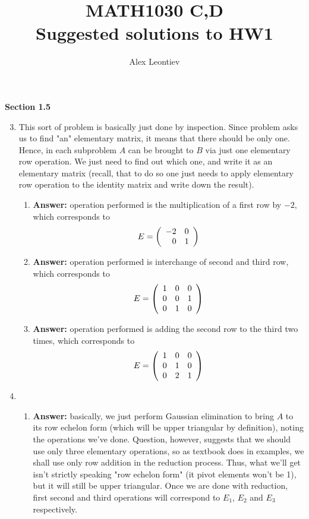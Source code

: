 \documentclass[8pt]{article} %
\title{MATH1030 C,D\\Suggested solutions to HW1}
\author{Alex Leontiev}
\begin{document}
\maketitle
	\renewcommand{\v}{\mathbf{v}}
	\renewcommand{\u}{\mathbf{u}}
	\renewcommand{\i}{\mathbf{i}}
	\renewcommand{\j}{\mathbf{j}}
	\renewcommand{\k}{\mathbf{k}}
	\newcommand{\w}{\mathbf{w}}
\textbf{Section 1.5}
\begin{enumerate}[label=\arabic*]
	\setcounter{enumi}{2}
	\item This sort of problem is basically just done by inspection. Since problem asks us to find "an" elementary matrix,
		it means that there should be only one. Hence, in each subproblem $A$ can be brought to $B$ via just one elementary
		row operation. We just need to find out which one, and write it as an elementary matrix (recall, that to do so
		one just needs to apply elementary row operation to the identity matrix and write down the result).
		\begin{enumerate}[label=(\alph*)]
			\item {\bf Answer: }operation performed is the multiplication of a first row by $-2$, which corresponds to
				\[E=\left(\begin{array}{rr}-2&0\\0&1\end{array}\right)\]
			\item {\bf Answer: }operation performed is interchange of second and third row, which corresponds to
				\[E=\left(\begin{array}{lll}1&0&0\\0&0&1\\0&1&0\end{array}\right)\]
			\item {\bf Answer: }operation performed is adding the second row to the third two times, which corresponds to
				\[E=\left(\begin{array}{lll}1&0&0\\0&1&0\\0&2&1\end{array}\right)\]
		\end{enumerate}
	\setcounter{enumi}{5}
	\item
		\begin{enumerate}[label=(\alph*)]
			\item {\bf Answer: }basically, we just perform Gaussian elimination to bring $A$ to its row echelon form
				(which will be upper triangular by definition), noting the operations we've done. Question, however,
				suggests that we should use only three elementary operations, so as textbook does in examples, we
				shall use only row addition in the reduction process. Thus, what we'll get isn't strictly speaking
				"row echelon form" (it pivot elements won't be 1), but it will still be upper triangular. Once
				we are done with reduction, first second and third operations will correspond to $E_1$, $E_2$ and $E_3
				$ respectively.
				

\end{enumerate}
\end{enumerate}
\end{document}
